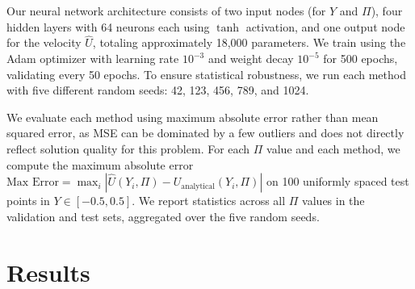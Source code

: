 \documentclass{article}
\begin{document}
Our neural network architecture consists of two input nodes (for $Y$ and $\Pi$), four hidden layers with 64 neurons each using $\tanh$ activation, and one output node for the velocity $\hat{U}$, totaling approximately 18,000 parameters. We train using the Adam optimizer with learning rate $10^{-3}$ and weight decay $10^{-5}$ for 500 epochs, validating every 50 epochs. To ensure statistical robustness, we run each method with five different random seeds: 42, 123, 456, 789, and 1024.

We evaluate each method using maximum absolute error rather than mean squared error, as MSE can be dominated by a few outliers and does not directly reflect solution quality for this problem. For each $\Pi$ value and each method, we compute the maximum absolute error $\text{Max Error} = \max_{i} |\hat{U}(Y_i, \Pi) - U_{\text{analytical}}(Y_i, \Pi)|$ on 100 uniformly spaced test points in $Y \in [-0.5, 0.5]$. We report statistics across all $\Pi$ values in the validation and test sets, aggregated over the five random seeds.

\section{Results}
\end{document}
